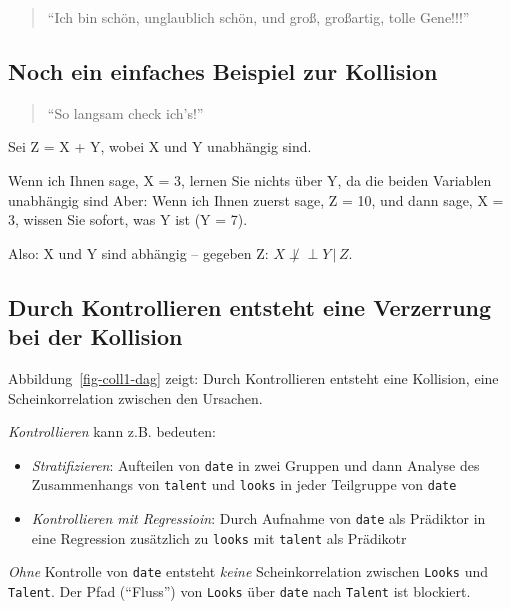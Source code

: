 \documentclass[
  a4paper,
  DIV=11]{scrreprt}
\providecommand{\tightlist}{%
  \setlength{\itemsep}{0pt}\setlength{\parskip}{0pt}}\usepackage{longtable,booktabs,array}
\theoremstyle{definition}
\theoremstyle{remark}
\begin{document}
\begin{quote}
``Ich bin schön, unglaublich schön, und groß, großartig, tolle Gene!!!''
🧑
\end{quote}

\hypertarget{noch-ein-einfaches-beispiel-zur-kollision}{%
\subsection{Noch ein einfaches Beispiel zur
Kollision}\label{noch-ein-einfaches-beispiel-zur-kollision}}

\begin{quote}
``So langsam check ich's!''
\end{quote}

Sei Z = X + Y, wobei X und Y unabhängig sind.

Wenn ich Ihnen sage, X = 3, lernen Sie nichts über Y, da die beiden
Variablen unabhängig sind Aber: Wenn ich Ihnen zuerst sage, Z = 10, und
dann sage, X = 3, wissen Sie sofort, was Y ist (Y = 7).

Also: X und Y sind abhängig -- gegeben Z:
\(X \not\perp \!\!\! \perp Y \,|\, Z\).

\hypertarget{durch-kontrollieren-entsteht-eine-verzerrung-bei-der-kollision}{%
\subsection{Durch Kontrollieren entsteht eine Verzerrung bei der
Kollision}\label{durch-kontrollieren-entsteht-eine-verzerrung-bei-der-kollision}}

Abbildung~\ref{fig-coll1-dag} zeigt: Durch Kontrollieren entsteht eine
Kollision, eine Scheinkorrelation zwischen den Ursachen.

\emph{Kontrollieren} kann z.B. bedeuten:

\begin{itemize}
\tightlist
\item
  \emph{Stratifizieren}: Aufteilen von \texttt{date} in zwei Gruppen und
  dann Analyse des Zusammenhangs von \texttt{talent} und \texttt{looks}
  in jeder Teilgruppe von \texttt{date}
\item
  \emph{Kontrollieren mit Regressioin}: Durch Aufnahme von \texttt{date}
  als Prädiktor in eine Regression zusätzlich zu \texttt{looks} mit
  \texttt{talent} als Prädikotr
\end{itemize}

\emph{Ohne} Kontrolle von \texttt{date} entsteht \emph{keine}
Scheinkorrelation zwischen \texttt{Looks} und \texttt{Talent}. Der Pfad
(``Fluss'') von \texttt{Looks} über \texttt{date} nach \texttt{Talent}
ist blockiert.
\end{document}
